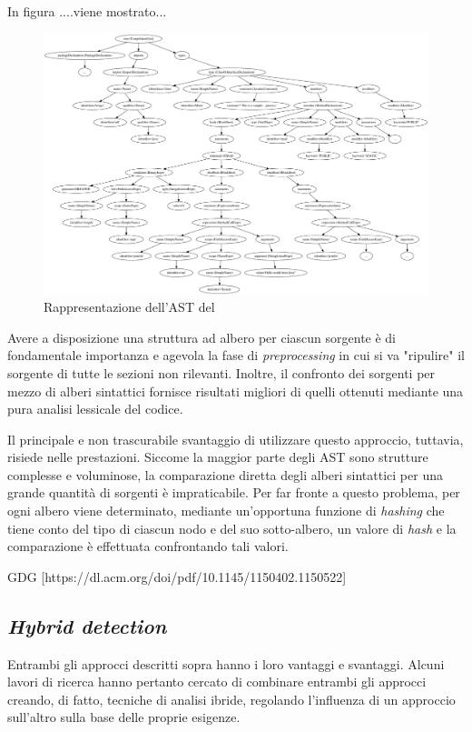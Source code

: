 In figura ....viene mostrato...

\begin{figure}
    \centering
    \includegraphics[width=\textwidth]{resources/img/01-ast-summarized.pdf}
    \caption{Rappresentazione dell'AST del }
    \label{img:01-ast}
\end{figure}

Avere a disposizione una struttura ad albero per ciascun sorgente è di fondamentale importanza e agevola la fase di \textit{preprocessing} in cui si va "ripulire" il sorgente di tutte le sezioni non rilevanti.
%
Inoltre, il confronto dei sorgenti per mezzo di alberi sintattici fornisce risultati migliori di quelli ottenuti mediante una pura analisi lessicale del codice.

Il principale e non trascurabile svantaggio di utilizzare questo approccio, tuttavia, risiede nelle prestazioni.
%
Siccome la maggior parte degli AST sono strutture complesse e voluminose, la comparazione diretta degli alberi sintattici per una grande quantità di sorgenti è impraticabile.
%
Per far fronte a questo problema, per ogni albero viene determinato, mediante un'opportuna funzione di \textit{hashing} che tiene conto del tipo di ciascun nodo e del suo sotto-albero, un valore di \textit{hash} e la comparazione è effettuata confrontando tali valori.

GDG
[https://dl.acm.org/doi/pdf/10.1145/1150402.1150522]

\subsection{\textit{Hybrid detection}}
Entrambi gli approcci descritti sopra hanno i loro vantaggi e svantaggi. 
%
Alcuni lavori di ricerca hanno pertanto cercato di combinare entrambi gli approcci creando, di fatto, tecniche di analisi ibride, regolando l'influenza di un approccio sull'altro sulla base delle proprie esigenze.

